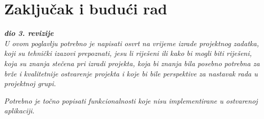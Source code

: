 \chapter{Zaključak i budući rad}

\textbf{\textit{dio 3. revizije}}\\

\textit{U ovom poglavlju potrebno je napisati osvrt na vrijeme izrade projektnog zadatka, koji su tehnički izazovi prepoznati, jesu li riješeni ili kako bi mogli biti riješeni, koja su znanja stečena pri izradi projekta, koja bi znanja bila posebno potrebna za brže i kvalitetnije ostvarenje projekta i koje bi bile perspektive za nastavak rada u projektnoj grupi.}

\textit{Potrebno je točno popisati funkcionalnosti koje nisu implementirane u ostvarenoj aplikaciji.}

\eject